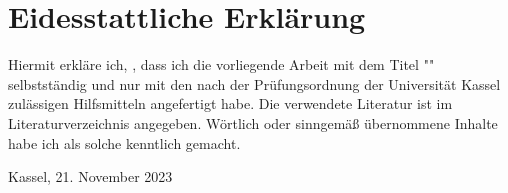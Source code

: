 \chapter*{Eidesstattliche Erklärung}


Hiermit erkläre ich, \thesisauthorname, dass ich die vorliegende Arbeit mit dem Titel "\thesistitle" selbstständig 
und nur mit den nach der Prüfungsordnung der Universität Kassel zulässigen Hilfsmitteln angefertigt habe.
Die verwendete Literatur ist im Literaturverzeichnis angegeben.
Wörtlich oder sinngemäß übernommene Inhalte habe ich als solche kenntlich gemacht.

\vspace{1cm}

Kassel, 21. November 2023

\begin{flushright}
  \underline{\hspace{7cm}} \\
  \thesisauthorname
\end{flushright}
